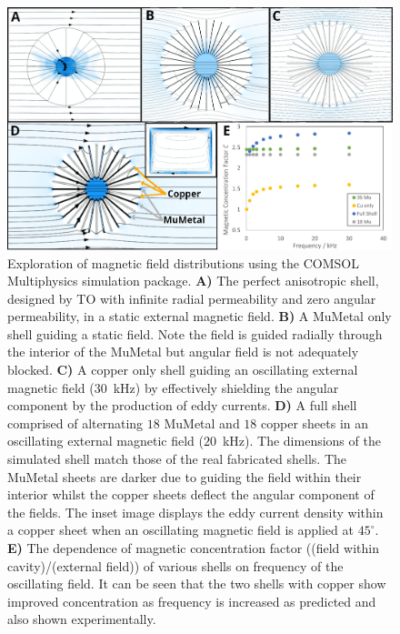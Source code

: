 \documentclass[11pt]{iopart}
\begin{document}
\begin{figure}
  \begin{center}
   \noindent\includegraphics[width=0.89\linewidth]{images/compoundCOMSOL.png}
  \end{center}
  \caption{
    Exploration of magnetic field distributions using the COMSOL
    Multiphysics simulation package.
    \textbf{A)} The perfect anisotropic shell, designed by TO with
    infinite radial permeability and zero angular permeability, in a
    static external magnetic field.
    \textbf{B)} A MuMetal only shell guiding a static field. Note the
    field is guided radially through the interior of the MuMetal but
    angular field is not adequately blocked.
    \textbf{C)} A copper only shell guiding an oscillating external
    magnetic field ($30$~kHz) by effectively shielding the angular component by
    the production of eddy currents.
    \textbf{D)} A full shell comprised of alternating $18$ MuMetal and
    $18$ copper sheets in an oscillating external magnetic field
    ($20$~kHz). The dimensions of the simulated shell match those of
    the real fabricated shells. The MuMetal sheets are darker due to
    guiding the field within their interior whilst the copper sheets
    deflect the angular component of the fields.  The inset image
    displays the eddy current density within a copper sheet when an
    oscillating magnetic field is applied at $45^\circ$.
    \textbf{E)} The dependence of magnetic concentration factor
    ((field within cavity)/(external field)) of various shells on
    frequency of the oscillating field. It can be seen that the two
    shells with copper show improved concentration as frequency is
    increased as predicted and also shown experimentally.
  }
  \label{fig:COMSOL}
\end{figure}
\end{document}
